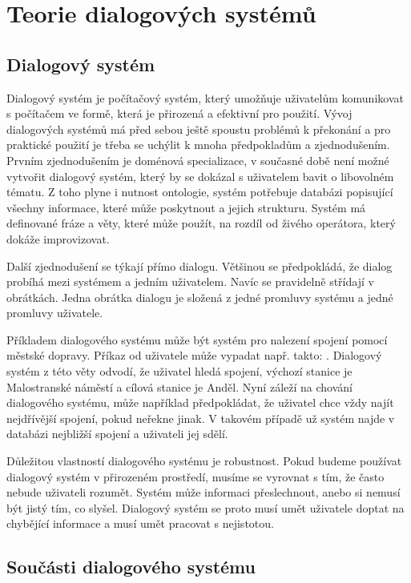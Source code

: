 \chapter{Teorie dialogových systémů}
\label{ch:kap1}

\section{Dialogový systém}

Dialogový systém je počítačový systém, který umožňuje uživatelům komunikovat s počítačem ve formě, která je přirozená a efektivní pro použití.
Vývoj dialogových systémů má před sebou ještě spoustu problémů k překonání a pro praktické použití je třeba se uchýlit k mnoha předpokladům a zjednodušením.
Prvním zjednodušením je doménová specializace, v současné době není možné vytvořit dialogový systém, který by se dokázal s uživatelem bavit o libovolném tématu.
Z toho plyne i nutnost ontologie, systém potřebuje databázi popisující všechny informace, které může poskytnout a jejich strukturu.
Systém má definované fráze a věty, které může použít, na rozdíl od živého operátora, který dokáže improvizovat.

Další zjednodušení se týkají přímo dialogu.
Většinou se předpokládá, že dialog probíhá mezi systémem a jedním uživatelem.
Navíc se pravidelně střídají v obrátkách.
Jedna obrátka dialogu je složená z jedné promluvy systému a jedné promluvy uživatele.

Příkladem dialogového systému může být systém pro nalezení spojení pomocí městské dopravy.
Příkaz od uživatele může vypadat např. takto: .
Dialogový systém z této věty odvodí, že uživatel hledá spojení, výchozí stanice je Malostranské náměstí a cílová stanice je Anděl.
Nyní záleží na chování dialogového systému, může například předpokládat, že uživatel chce vždy najít nejdřívější spojení, pokud neřekne jinak.
V takovém případě už systém najde v databázi nejbližší spojení a uživateli jej sdělí.

Důležitou vlastností dialogového systému je robustnost.
Pokud budeme používat dialogový systém v přirozeném prostředí, musíme se vyrovnat s tím, že často nebude uživateli rozumět.
Systém může informaci přeslechnout, anebo si nemusí být jistý tím, co slyšel.
Dialogový systém se proto musí umět uživatele doptat na chybějící informace a musí umět pracovat s nejistotou.

\section{Součásti dialogového systému}

